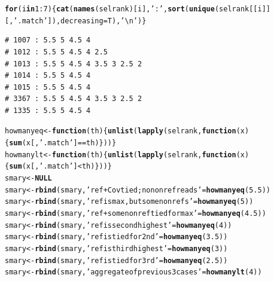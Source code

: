 \documentclass{article}\usepackage[]{graphicx}\usepackage[]{color}
\makeatletter
\newcommand{\hlnum}[1]{\textcolor[rgb]{0.686,0.059,0.569}{#1}}%
\newcommand{\hlstr}[1]{\textcolor[rgb]{0.192,0.494,0.8}{#1}}%
\newcommand{\hlopt}[1]{\textcolor[rgb]{0,0,0}{#1}}%
\newcommand{\hlstd}[1]{\textcolor[rgb]{0.345,0.345,0.345}{#1}}%
\newcommand{\hlkwa}[1]{\textcolor[rgb]{0.161,0.373,0.58}{\textbf{#1}}}%
\newcommand{\hlkwb}[1]{\textcolor[rgb]{0.69,0.353,0.396}{#1}}%
\newcommand{\hlkwc}[1]{\textcolor[rgb]{0.333,0.667,0.333}{#1}}%
\newcommand{\hlkwd}[1]{\textcolor[rgb]{0.737,0.353,0.396}{\textbf{#1}}}%
\newenvironment{kframe}{%
 \def\at@end@of@kframe{}%
 \ifinner\ifhmode%
  \def\at@end@of@kframe{\end{minipage}}%
  \begin{minipage}{\columnwidth}%
 \fi\fi%
 \def\FrameCommand##1{\hskip\@totalleftmargin \hskip-\fboxsep
 \colorbox{shadecolor}{##1}\hskip-\fboxsep
     \hskip-\linewidth \hskip-\@totalleftmargin \hskip\columnwidth}%
 \MakeFramed {\advance\hsize-\width
   \@totalleftmargin\z@ \linewidth\hsize
   \@setminipage}}%
 {\par\unskip\endMakeFramed%
 \at@end@of@kframe}
\newenvironment{knitrout}{}{} %
\makeatother
\begin{document}
\begin{knitrout}\footnotesize
{}\color{fgcolor}\begin{kframe}
\begin{alltt}
\hlkwa{for}\hlstd{(i} \hlkwa{in} \hlnum{1}\hlopt{:}\hlnum{7}\hlstd{)\{}\hlkwd{cat}\hlstd{(}\hlkwd{names}\hlstd{(selrank)[i],} \hlstr{':'}\hlstd{,}  \hlkwd{sort}\hlstd{(}\hlkwd{unique}\hlstd{(selrank[[i]][,}\hlstr{'.match'}\hlstd{]),}\hlkwc{decreasing}\hlstd{=T),}\hlstr{'\textbackslash{}n'}\hlstd{)\}}
\end{alltt}
\begin{verbatim}
# 1007 : 5.5 5 4.5 4 
# 1012 : 5.5 5 4.5 4 2.5 
# 1013 : 5.5 5 4.5 4 3.5 3 2.5 2 
# 1014 : 5.5 5 4.5 4 
# 1015 : 5.5 5 4.5 4 
# 3367 : 5.5 5 4.5 4 3.5 3 2.5 2 
# 1335 : 5.5 5 4.5 4
\end{verbatim}
\begin{alltt}
\hlstd{howmanyeq} \hlkwb{<-} \hlkwa{function}\hlstd{(}\hlkwc{th}\hlstd{)\{}\hlkwd{unlist}\hlstd{(}\hlkwd{lapply}\hlstd{(selrank,}\hlkwa{function}\hlstd{(}\hlkwc{x}\hlstd{)\{}\hlkwd{sum}\hlstd{(x[,}\hlstr{'.match'}\hlstd{]} \hlopt{==} \hlstd{th)\}))\}}
\hlstd{howmanylt} \hlkwb{<-} \hlkwa{function}\hlstd{(}\hlkwc{th}\hlstd{)\{}\hlkwd{unlist}\hlstd{(}\hlkwd{lapply}\hlstd{(selrank,}\hlkwa{function}\hlstd{(}\hlkwc{x}\hlstd{)\{}\hlkwd{sum}\hlstd{(x[,}\hlstr{'.match'}\hlstd{]} \hlopt{<}  \hlstd{th)\}))\}}
\hlstd{smary} \hlkwb{<-} \hlkwa{NULL}
\hlstd{smary} \hlkwb{<-} \hlkwd{rbind}\hlstd{(smary,}\hlstr{'ref + Cov tied; no nonref reads'}\hlstd{=}\hlkwd{howmanyeq}\hlstd{(}\hlnum{5.5}\hlstd{))}
\hlstd{smary} \hlkwb{<-} \hlkwd{rbind}\hlstd{(smary,}\hlstr{'ref is max, but some nonrefs'}   \hlstd{=}\hlkwd{howmanyeq}\hlstd{(}\hlnum{5}  \hlstd{))}
\hlstd{smary} \hlkwb{<-} \hlkwd{rbind}\hlstd{(smary,}\hlstr{'ref + some nonref tied for max'} \hlstd{=}\hlkwd{howmanyeq}\hlstd{(}\hlnum{4.5}\hlstd{))}
\hlstd{smary} \hlkwb{<-} \hlkwd{rbind}\hlstd{(smary,}\hlstr{'ref is second highest'}          \hlstd{=}\hlkwd{howmanyeq}\hlstd{(}\hlnum{4}  \hlstd{))}
\hlstd{smary} \hlkwb{<-} \hlkwd{rbind}\hlstd{(smary,}\hlstr{'ref is tied for 2nd'}            \hlstd{=}\hlkwd{howmanyeq}\hlstd{(}\hlnum{3.5}\hlstd{))}
\hlstd{smary} \hlkwb{<-} \hlkwd{rbind}\hlstd{(smary,}\hlstr{'ref is third highest'}           \hlstd{=}\hlkwd{howmanyeq}\hlstd{(}\hlnum{3}  \hlstd{))}
\hlstd{smary} \hlkwb{<-} \hlkwd{rbind}\hlstd{(smary,}\hlstr{'ref is tied for 3rd'}            \hlstd{=}\hlkwd{howmanyeq}\hlstd{(}\hlnum{2.5}\hlstd{))}
\hlstd{smary} \hlkwb{<-} \hlkwd{rbind}\hlstd{(smary,}\hlstr{'aggregate of previous 3 cases'}  \hlstd{=}\hlkwd{howmanylt}\hlstd{(}\hlnum{4}  \hlstd{))}

\end{alltt}
\end{kframe}
\end{knitrout}
\end{document}
